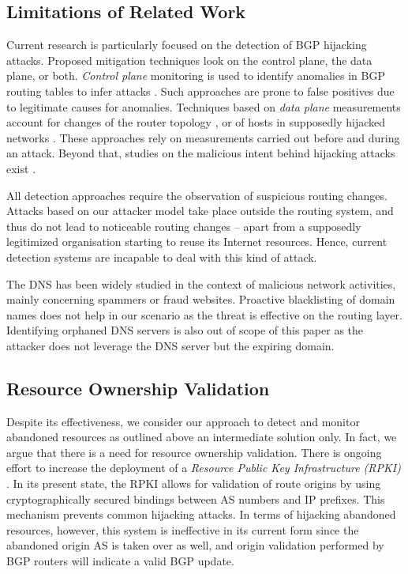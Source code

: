 \documentclass{llncs}
\begin{document}
 
\subsection{Limitations of Related Work} Current research is particularly
focused on the detection of BGP hijacking attacks. Proposed mitigation
techniques look on the control plane, the data plane, or both. \emph{Control
plane} monitoring is used to identify anomalies in BGP routing tables to infer
attacks \cite{phas,study,bogus,waehlisch,jacquemart14}. Such approaches are
prone to false positives due to legitimate causes for anomalies. Techniques
based on \emph{data plane} measurements account for changes of the router
topology \cite{hopcount,ispy}, or of hosts in supposedly hijacked networks
\cite{fingerprint,idle,argus}. These approaches rely on measurements carried
out before and during an attack. Beyond that, studies on the malicious intent
behind hijacking attacks exist \cite{flyby,spamtracer,ashijack,malicious}.

All detection approaches require the observation of suspicious routing changes.
Attacks based on our attacker model take place outside the routing system, and
thus do not lead to noticeable routing changes -- apart from a supposedly
legitimized organisation starting to reuse its Internet resources. Hence,
current detection systems are incapable to deal with this kind of attack.

The DNS has been widely studied in the context of malicious network activities,
mainly concerning spammers or fraud websites. Proactive blacklisting of domain
names \cite{fkp-ppdb-10} does not help in our scenario as the threat is
effective on the routing layer. Identifying orphaned DNS servers
\cite{kgccm-esods-10} is also out of scope of this paper as the attacker does
not leverage the DNS server but the expiring domain.


\subsection{Resource Ownership Validation} Despite its effectiveness, we
consider our approach to detect and monitor abandoned resources as outlined
above an intermediate solution only. In fact, we argue that there is a need for
resource ownership validation.
There is ongoing effort to increase the deployment of a \textit{Resource Public
Key Infrastructure (RPKI)} \cite{RFC-6480}. In its present state, the RPKI
allows for validation of route origins by using cryptographically secured
bindings between AS numbers and IP prefixes. This mechanism prevents common
hijacking attacks. In terms of hijacking abandoned resources, however, this
system is ineffective in its current form since the abandoned origin AS is
taken over as well, and origin validation performed by BGP routers
\cite{rfc-6811} will indicate a valid BGP update.
\end{document}
